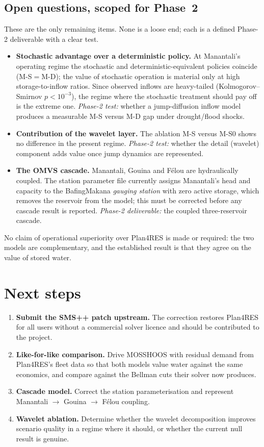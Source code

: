 \documentclass[12pt,a4paper]{article}
\begin{document}
\subsection{Open questions, scoped for Phase~2}
These are the only remaining items. None is a loose end; each is a defined
Phase-2 deliverable with a clear test.
\begin{itemize}[itemsep=2pt]
\item \textbf{Stochastic advantage over a deterministic policy.} At Manantali's
operating regime the stochastic and deterministic-equivalent policies coincide
(M-S$=$M-D); the value of stochastic operation is material only at high
storage-to-inflow ratios. Since observed inflows are heavy-tailed
(Kolmogorov--Smirnov $p<10^{-3}$), the regime where the stochastic treatment
should pay off is the extreme one. \emph{Phase-2 test:} whether a jump-diffusion
inflow model produces a measurable M-S versus M-D gap under drought/flood shocks.
\item \textbf{Contribution of the wavelet layer.} The ablation M-S versus M-S0
shows no difference in the present regime. \emph{Phase-2 test:} whether the
detail (wavelet) component adds value once jump dynamics are represented.
\item \textbf{The OMVS cascade.} Manantali, Gouina and Félou are hydraulically
coupled. The station parameter file currently assigns Manantali's head and
capacity to the BafingMakana \emph{gauging station} with zero active storage,
which removes the reservoir from the model; this must be corrected before any
cascade result is reported. \emph{Phase-2 deliverable:} the coupled
three-reservoir cascade.
\end{itemize}

No claim of operational superiority over Plan4RES is made or required: the two
models are complementary, and the established result is that they agree on the
value of stored water.

\section{Next steps}

\begin{enumerate}[itemsep=3pt]
\item \textbf{Submit the SMS++ patch upstream.} The correction restores Plan4RES
for all users without a commercial solver licence and should be contributed to
the project.
\item \textbf{Like-for-like comparison.} Drive MOSSHOOS with residual demand from
Plan4RES's fleet data so that both models value water against the same economics,
and compare against the Bellman cuts their solver now produces.
\item \textbf{Cascade model.} Correct the station parameterisation and represent
Manantali $\rightarrow$ Gouina $\rightarrow$ Félou coupling.
\item \textbf{Wavelet ablation.} Determine whether the wavelet decomposition
improves scenario quality in a regime where it should, or whether the current
null result is genuine.
\end{enumerate}
\end{document}
